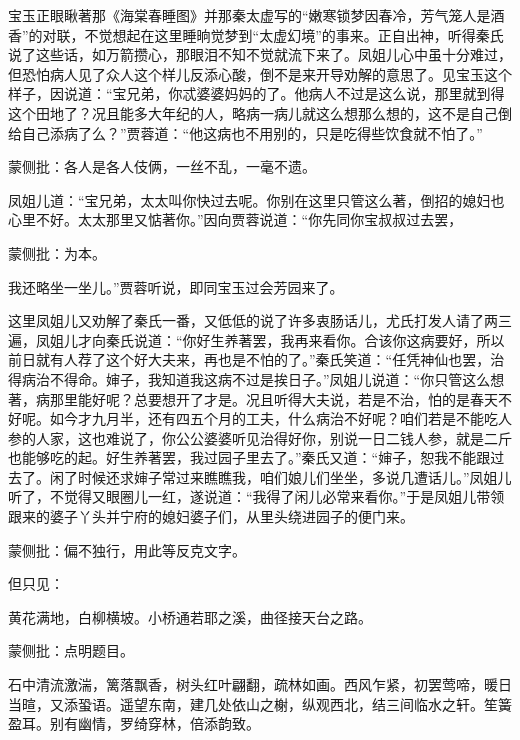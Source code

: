 \begin{parag}
    宝玉正眼瞅著那《海棠春睡图》并那秦太虚写的“嫩寒锁梦因春冷，芳气笼人是酒香”的对联，不觉想起在这里睡晌觉梦到“太虚幻境”的事来。正自出神，听得秦氏说了这些话，如万箭攒心，那眼泪不知不觉就流下来了。凤姐儿心中虽十分难过，但恐怕病人见了众人这个样儿反添心酸，倒不是来开导劝解的意思了。见宝玉这个样子，因说道：“宝兄弟，你忒婆婆妈妈的了。他病人不过是这么说，那里就到得这个田地了？况且能多大年纪的人，略病一病儿就这么想那么想的，这不是自己倒给自己添病了么？”贾蓉道：“他这病也不用别的，只是吃得些饮食就不怕了。”\begin{note}蒙侧批：各人是各人伎俩，一丝不乱，一毫不遗。\end{note}凤姐儿道：“宝兄弟，太太叫你快过去呢。你别在这里只管这么著，倒招的媳妇也心里不好。太太那里又惦著你。”因向贾蓉说道：“你先同你宝叔叔过去罢，\begin{note}蒙侧批：为本。\end{note}我还略坐一坐儿。”贾蓉听说，即同宝玉过会芳园来了。
\end{parag}


\begin{parag}
    这里凤姐儿又劝解了秦氏一番，又低低的说了许多衷肠话儿，尤氏打发人请了两三遍，凤姐儿才向秦氏说道：“你好生养著罢，我再来看你。合该你这病要好，所以前日就有人荐了这个好大夫来，再也是不怕的了。”秦氏笑道：“任凭神仙也罢，治得病治不得命。婶子，我知道我这病不过是挨日子。”凤姐儿说道：“你只管这么想著，病那里能好呢？总要想开了才是。况且听得大夫说，若是不治，怕的是春天不好呢。如今才九月半，还有四五个月的工夫，什么病治不好呢？咱们若是不能吃人参的人家，这也难说了，你公公婆婆听见治得好你，别说一日二钱人参，就是二斤也能够吃的起。好生养著罢，我过园子里去了。”秦氏又道：“婶子，恕我不能跟过去了。闲了时候还求婶子常过来瞧瞧我，咱们娘儿们坐坐，多说几遭话儿。”凤姐儿听了，不觉得又眼圈儿一红，遂说道：“我得了闲儿必常来看你。”于是凤姐儿带领跟来的婆子丫头并宁府的媳妇婆子们，从里头绕进园子的便门来。\begin{note}蒙侧批：偏不独行，用此等反克文字。\end{note}但只见：
\end{parag}
\begin{qute2sp}
    黄花满地，白柳横坡。小桥通若耶之溪，曲径接天台之路。\begin{note}蒙侧批：点明题目。\end{note}石中清流激湍，篱落飘香，树头红叶翩翻，疏林如画。西风乍紧，初罢莺啼，暖日当暄，又添蛩语。遥望东南，建几处依山之榭，纵观西北，结三间临水之轩。笙簧盈耳。别有幽情，罗绮穿林，倍添韵致。
\end{qute2sp}


